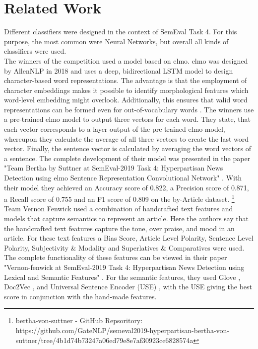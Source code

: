 \documentclass[a4paper, 11pt,titlepage,oneside,openany]{book}
\begin{document}
\chapter{Related Work}
Different classifiers were designed in the context of SemEval Task 4. For this purpose, the most common were Neural Networks, but overall all kinds of classifiers were used. \\
\indent The winners of the competition used a model based on \gls{elmo}. \gls{elmo} was designed by AllenNLP in 2018 and uses a deep, bidirectional LSTM model to design character-based word representations. The advantage is that the employment of character embeddings makes it possible to identify morphological features which word-level embedding might overlook. Additionally, this ensures that valid word representations can be formed even for out-of-vocabulary words \cite{elmo}. The winners use a pre-trained \gls{elmo} model to output three vectors for each word. They state, that each vector corresponds to a layer output of the pre-trained \gls{elmo} model, whereupon they calculate the average of all three vectors to create the last word vector. Finally, the sentence vector is calculated by averaging the word vectors of a sentence. The complete development of their model was presented in the paper "Team Bertha by Suttner at SemEval-2019 Task 4: Hyperpartisan News Detection using \gls{elmo} Sentence Representation Convolutional Network" \cite{gewinner}. With their model they achieved an Accuracy score of 0.822, a Precision score of 0.871, a Recall score of 0.755 and an F1 score of 0.809 on the by-Article dataset. \footnote{bertha-von-suttner - GitHub Repsoritory: https://github.com/GateNLP/semeval2019-hyperpartisan-bertha-von-suttner/tree/4b1d74b73247a06ed79e8e7af30923ce6828574a} \\
\indent Team Vernon Fenwick used a combination of handcrafted text features and models that capture semantics to represent an article. Here the authors say that the handcrafted text features capture the tone, over praise, and mood in an article. For these text features a Bias Score, Article Level Polarity, Sentence Level Polarity, Subjectivity \& Modality and Superlatives \& Comparatives were used. The complete functionality of these features can be viewed in their paper "Vernon-fenwick at SemEval-2019 Task 4: Hyperpartisan News Detection using Lexical and Semantic Features" \cite{vernon}. For the semantic features, they used Glove \cite{glove}, Doc2Vec \cite{doc2vec}, and Universal Sentence Encoder (USE) \cite{use}, with the USE giving the best score in conjunction with the hand-made features. 
\end{document}
